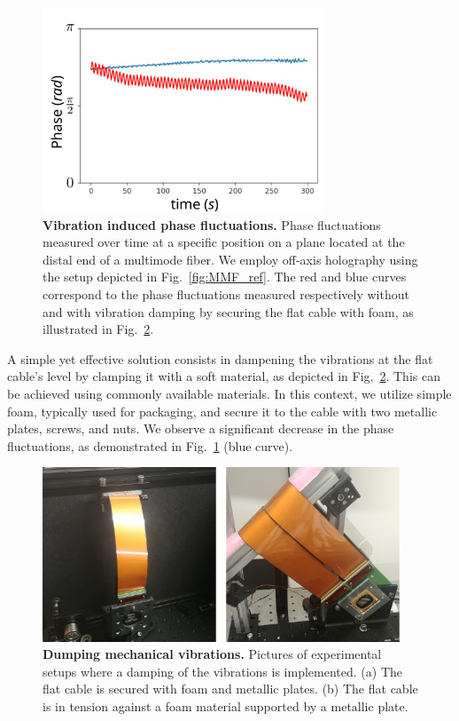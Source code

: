 \documentclass[12pt]{iopart}
\begin{document}
\begin{figure}[ht]
  \centering
  \includegraphics[width = 0.75\textwidth]{images/phase_vibrations.pdf}
  \caption{
    \textbf{Vibration induced phase fluctuations.}
    Phase fluctuations measured over time at
    a specific position on a plane located at the distal end of a multimode fiber.
    We employ off-axis holography using the setup depicted in Fig.~\ref{fig:MMF_ref}.
    The red and blue curves correspond to the phase fluctuations
    measured respectively without and with vibration damping
    by securing the flat cable with foam, as illustrated in Fig.~\ref{fig:dumping}.
  }
  \label{fig:phase_vibrations}
\end{figure}


A simple yet effective solution consists in dampening the vibrations
at the flat cable's level by clamping it with a soft material,
as depicted in Fig.~\ref{fig:dumping}.
This can be achieved using commonly available materials.
In this context, we utilize simple foam, typically used for packaging, and secure it to the cable
with two metallic plates, screws, and nuts.
We observe a significant decrease in the phase fluctuations,
as demonstrated in Fig.~\ref{fig:phase_vibrations} (blue curve).\\



\begin{figure}[ht]
  \centering
  \includegraphics[width = 0.95\textwidth]{images/dumping.pdf}
  \caption{
    \textbf{Dumping mechanical vibrations.}
    Pictures of experimental setups where a damping of the vibrations is implemented.
    (a) The flat cable is secured with foam and metallic plates.
    (b) The flat cable is in tension against a foam material supported by a metallic plate.
  }
  \label{fig:dumping}
\end{figure}
\end{document}
